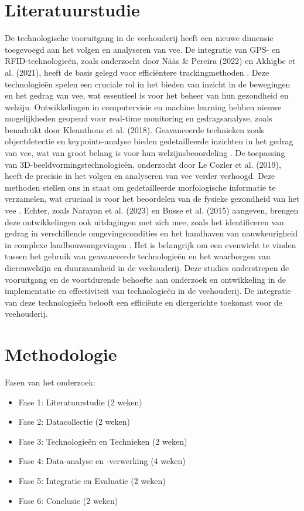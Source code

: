 \section{Literatuurstudie}%
\label{sec:state-of-the-art}
De technologische vooruitgang in de veehouderij heeft een nieuwe dimensie toegevoegd aan het volgen en analyseren van vee. 
De integratie van GPS- en RFID-technologieën, zoals onderzocht door Nääs & Pereira (2022) en Akhigbe et al. (2021), heeft de basis gelegd voor efficiëntere trackingmethoden \autocite{Nääs2013}\autocite{Akhigbe2021}. Deze technologieën spelen een cruciale rol in het bieden van inzicht in de bewegingen en het gedrag van vee, wat essentieel is voor het beheer van hun gezondheid en welzijn.
Ontwikkelingen in computervisie en machine learning hebben nieuwe mogelijkheden geopend voor real-time monitoring en gedragsanalyse, zoals benadrukt door Kleanthous et al. (2018). 
Geavanceerde technieken zoals objectdetectie en keypoints-analyse bieden gedetailleerde inzichten in het gedrag van vee, wat van groot belang is voor hun welzijnsbeoordeling \autocite{Kleanthous2018}.
De toepassing van 3D-beeldvormingstechnologieën, onderzocht door Le Cozler et al. (2019), heeft de precisie in het volgen en analyseren van vee verder verhoogd. 
Deze methoden stellen ons in staat om gedetailleerde morfologische informatie te verzamelen, wat cruciaal is voor het beoordelen van de fysieke gezondheid van het vee \autocite{LeCozler2019}.
Echter, zoals Narayan et al. (2023) en Busse et al. (2015) aangeven, brengen deze ontwikkelingen ook uitdagingen met zich mee, zoals het identificeren van gedrag in verschillende omgevingscondities en het handhaven van nauwkeurigheid in complexe landbouwomgevingen \autocite{Narayan2023}\autocite{Busse2015}. Het is belangrijk om een evenwicht te vinden tussen het gebruik van geavanceerde technologieën en het waarborgen van dierenwelzijn en duurzaamheid in de veehouderij.
Deze studies onderstrepen de vooruitgang en de voortdurende behoefte aan onderzoek en ontwikkeling in de implementatie en effectiviteit van technologieën in de veehouderij. De integratie van deze technologieën belooft een efficiënte en diergerichte toekomst voor de veehouderij.
\section{Methodologie}%
\label{sec:methodologie}
Fasen van het onderzoek:
\begin{itemize}
  \item Fase 1: Literatuurstudie (2 weken)
  \item Fase 2: Datacollectie (2 weken)
  \item Fase 3: Technologieën en Technieken (2 weken)
  \item Fase 4: Data-analyse en -verwerking (4 weken)
  \item Fase 5: Integratie en Evaluatie (2 weken)
  \item Fase 6: Conclusie (2 weken)
\end{itemize}


